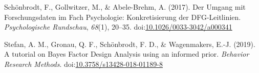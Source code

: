 \documentclass[man]{apa6}
\begin{document}
\leavevmode\hypertarget{ref-schonbrodt2017}{}%
Schönbrodt, F., Gollwitzer, M., \& Abele-Brehm, A. (2017). Der Umgang mit Forschungsdaten im Fach Psychologie: Konkretisierung der DFG-Leitlinien. \emph{Psychologische Rundschau}, \emph{68}(1), 20--35. doi:\href{https://doi.org/10.1026/0033-3042/a000341}{10.1026/0033-3042/a000341}

\leavevmode\hypertarget{ref-stefan2019}{}%
Stefan, A. M., Gronau, Q. F., Schönbrodt, F. D., \& Wagenmakers, E.-J. (2019). A tutorial on Bayes Factor Design Analysis using an informed prior. \emph{Behavior Research Methods}. doi:\href{https://doi.org/10.3758/s13428-018-01189-8}{10.3758/s13428-018-01189-8}

\endgroup
\end{document}
